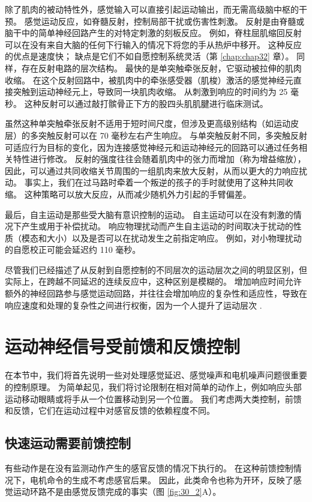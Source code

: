 除了肌肉的被动特性外，感觉输入可以直接引起运动输出，而无需高级脑中枢的干预。 感觉运动反应，如脊髓反射，控制局部干扰或伤害性刺激。 反射是由脊髓或脑干中的简单神经回路产生的对特定刺激的刻板反应。 例如，脊柱屈肌缩回反射可以在没有来自大脑的任何下行输入的情况下将您的手从热炉中移开。 这种反应的优点是速度快； 缺点是它们不如自愿控制系统灵活（第 \ref{chap:chap32} 章）。 同样，存在反射电路的层次结构。 最快的是单突触牵张反射，它驱动被拉伸的肌肉收缩。 在这个反射回路中，被肌肉中的牵张感受器（肌梭）激活的感觉神经元直接突触到运动神经元上，导致同一块肌肉收缩。 从刺激到响应的时间约为 25 毫秒。 这种反射可以通过敲打髌骨正下方的股四头肌肌腱进行临床测试。

虽然这种单突触牵张反射不适用于短时间尺度，但涉及更高级别结构（如运动皮层）的多突触反射可以在 70 毫秒左右产生响应。 与单突触反射不同，多突触反射可适应行为目标的变化，因为连接感觉神经元和运动神经元的回路可以通过任务相关特性进行修改。 反射的强度往往会随着肌肉中的张力而增加（称为增益缩放），因此，可以通过共同收缩关节周围的一组肌肉来放大反射，从而以更大的力响应扰动。 事实上，我们在过马路时牵着一个叛逆的孩子的手时就使用了这种共同收缩。 这种策略可以放大反应，从而减少随机外力引起的手臂偏差。

最后，自主运动是那些受大脑有意识控制的运动。 自主运动可以在没有刺激的情况下产生或用于补偿扰动。 响应物理扰动而产生自主运动的时间取决于扰动的性质（模态和大小）以及是否可以在扰动发生之前指定响应。 例如，对小物理扰动的自愿校正可能会延迟约 110 毫秒。

尽管我们已经描述了从反射到自愿控制的不同层次的运动层次之间的明显区别，但实际上，在跨越不同延迟的连续反应中，这种区别是模糊的。 增加响应时间允许额外的神经回路参与感觉运动回路，并往往会增加响应的复杂性和适应性，导致在响应速度和处理的复杂性之间进行权衡，因为一个人提升了运动层次 .


\section{运动神经信号受前馈和反馈控制}
在本节中，我们将首先说明一些对处理感觉延迟、感觉噪声和电机噪声问题很重要的控制原理。 为简单起见，我们将讨论限制在相对简单的动作上，例如响应头部运动移动眼睛或将手从一个位置移动到另一个位置。 我们考虑两大类控制，前馈和反馈，它们在运动过程中对感官反馈的依赖程度不同。


\subsection{快速运动需要前馈控制}

有些动作是在没有监测动作产生的感官反馈的情况下执行的。 在这种前馈控制情况下，电机命令的生成不考虑感官后果。 因此，此类命令也称为开环，反映了感觉运动环路不是由感觉反馈完成的事实（图 \ref{fig:30_2}A）。

